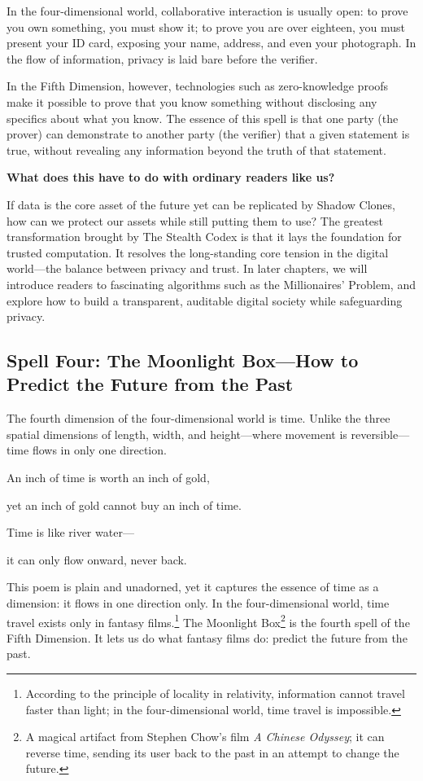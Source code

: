 In the four-dimensional world, collaborative interaction is usually open: to prove you own something, you must show it; to prove you are over eighteen, you must present your ID card, exposing your name, address, and even your photograph.
In the flow of information, privacy is laid bare before the verifier.

In the Fifth Dimension, however, technologies such as zero-knowledge proofs make it possible to prove that you know something without disclosing any specifics about what you know. The essence of this spell is that one party (the prover) can demonstrate to another party (the verifier) that a given statement is true, without revealing any information beyond the truth of that statement.

\vspace{1em}

\textbf{What does this have to do with ordinary readers like us?}

If data is the core asset of the future yet can be replicated by Shadow Clones, how can we protect our assets while still putting them to use?
The greatest transformation brought by The Stealth Codex is that it lays the foundation for trusted computation. It resolves the long-standing core tension in the digital world---the balance between privacy and trust. In later chapters, we will introduce readers to fascinating algorithms such as the Millionaires' Problem, and explore how to build a transparent, auditable digital society while safeguarding privacy.


\subsection{Spell Four: The Moonlight Box---How to Predict the Future from the Past}
The fourth dimension of the four-dimensional world is time. Unlike the three spatial dimensions of length, width, and height---where movement is reversible---time flows in only one direction.

\begin{myquote}
An inch of time is worth an inch of gold,

yet an inch of gold cannot buy an inch of time.

Time is like river water---

it can only flow onward, never back.
\end{myquote}

This poem is plain and unadorned, yet it captures the essence of time as a dimension: it flows in one direction only. In the four-dimensional world, time travel exists only in fantasy films.\footnote{According to the principle of locality in relativity, information cannot travel faster than light; in the four-dimensional world, time travel is impossible.} The Moonlight Box\footnote{A magical artifact from Stephen Chow's film \textit{A Chinese Odyssey}; it can reverse time, sending its user back to the past in an attempt to change the future.} is the fourth spell of the Fifth Dimension. It lets us do what fantasy films do: predict the future from the past.

